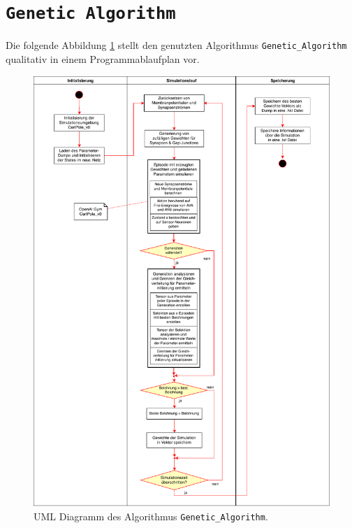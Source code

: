 	\section{\texttt{Genetic Algorithm}}
	\label{app:UML_GA}
	\enlargethispage{2\baselineskip}
	Die folgende Abbildung \ref{fig:uml_weights} stellt den genutzten Algorithmus \texttt{Genetic\_Algorithm} qualitativ in einem Programmablaufplan vor.
	\begin{figure}[H]
		\centering
		\includegraphics[width=14cm]{figures/appendix/uml_ga.pdf}
		\caption{UML Diagramm des Algorithmus \texttt{Genetic\_Algorithm}.}
		\label{fig:uml_weights}
	\end{figure}
	
